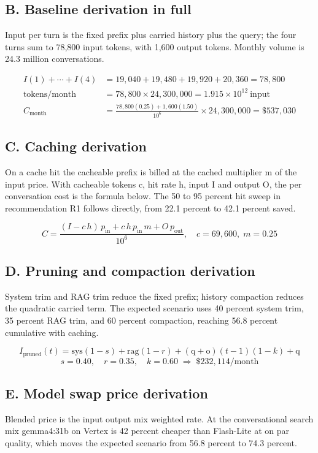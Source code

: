 \documentclass[11pt]{uce-report}
\begin{document}
\subsection{B. Baseline derivation in full}
Input per turn is the fixed prefix plus carried history plus the query; the four turns sum to 78,800 input tokens, with 1,600 output tokens. Monthly volume is 24.3 million conversations.


\[
\begin{aligned}
I(1)+\cdots+I(4) &= 19{,}040 + 19{,}480 + 19{,}920 + 20{,}360 = 78{,}800 \\[2pt]
\text{tokens/month} &= 78{,}800 \times 24{,}300{,}000 = 1.915\times 10^{12}\ \text{input} \\[2pt]
C_{\text{month}} &= \frac{78{,}800(0.25) + 1{,}600(1.50)}{10^{6}} \times 24{,}300{,}000 = \$537{,}030
\end{aligned}
\]

\subsection{C. Caching derivation}
On a cache hit the cacheable prefix is billed at the cached multiplier m of the input price. With cacheable tokens c, hit rate h, input I and output O, the per conversation cost is the formula below. The 50 to 95 percent hit sweep in recommendation R1 follows directly, from 22.1 percent to 42.1 percent saved.


\[C = \frac{(I - c\,h)\,p_{\text{in}} + c\,h\,p_{\text{in}}\,m + O\,p_{\text{out}}}{10^{6}}, \quad c = 69{,}600,\; m = 0.25\]
\subsection{D. Pruning and compaction derivation}
System trim and RAG trim reduce the fixed prefix; history compaction reduces the quadratic carried term. The expected scenario uses 40 percent system trim, 35 percent RAG trim, and 60 percent compaction, reaching 56.8 percent cumulative with caching.


\[I_{\text{pruned}}(t) = \text{sys}(1 - s) + \text{rag}(1 - r) + (\text{q}+\text{o})(t-1)(1 - k) + \text{q}\]
\[s = 0.40,\quad r = 0.35,\quad k = 0.60 \;\Rightarrow\; \$232{,}114/\text{month}\]
\subsection{E. Model swap price derivation}
Blended price is the input output mix weighted rate. At the conversational search mix gemma4:31b on Vertex is 42 percent cheaper than Flash-Lite at on par quality, which moves the expected scenario from 56.8 percent to 74.3 percent.
\end{document}

